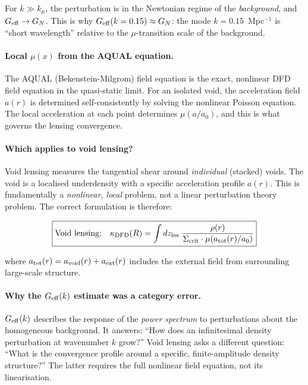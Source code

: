 \documentclass[11pt,a4paper]{article}
\newcommand{\Geff}{G_{\rm eff}}
\begin{document}
For $k \gg k_\mu$, the perturbation is in the Newtonian regime of the
\emph{background}, and $\Geff \to G_N$.  This is why $\Geff(k = 0.15) \approx
G_N$: the mode $k = 0.15$~Mpc$^{-1}$ is ``short wavelength'' relative
to the $\mu$-transition scale of the background.

\paragraph{Local $\mu(x)$ from the AQUAL equation.}
The AQUAL (Bekenstein-Milgrom) field equation is the exact, nonlinear
DFD field equation in the quasi-static limit.  For an isolated void,
the acceleration field $a(r)$ is determined self-consistently by
solving the nonlinear Poisson equation.  The local acceleration at
each point determines $\mu(a/a_0)$, and this is what governs the
lensing convergence.

\paragraph{Which applies to void lensing?}
Void lensing measures the tangential shear around \emph{individual}
(stacked) voids.  The void is a localised underdensity with a specific
acceleration profile $a(r)$.  This is fundamentally a \emph{nonlinear,
local} problem, not a linear perturbation theory problem.  The correct
formulation is therefore:

\begin{equation}
\boxed{
\text{Void lensing:} \quad
\kappa_{\rm DFD}(R) = \int dz_{\rm los}\;\frac{\rho(r)}{
  \Sigma_{\rm crit} \cdot \mu(a_{\rm tot}(r)/a_0)}
}
\end{equation}

where $a_{\rm tot}(r) = a_{\rm void}(r) + a_{\rm ext}(r)$ includes the
external field from surrounding large-scale structure.

\paragraph{Why the $\Geff(k)$ estimate was a category error.}
$\Geff(k)$ describes the response of the \emph{power spectrum} to
perturbations about the homogeneous background.  It answers: ``How does
an infinitesimal density perturbation at wavenumber $k$ grow?''  Void
lensing asks a different question: ``What is the convergence profile
around a specific, finite-amplitude density structure?''  The latter
requires the full nonlinear field equation, not its linearisation.
\end{document}
